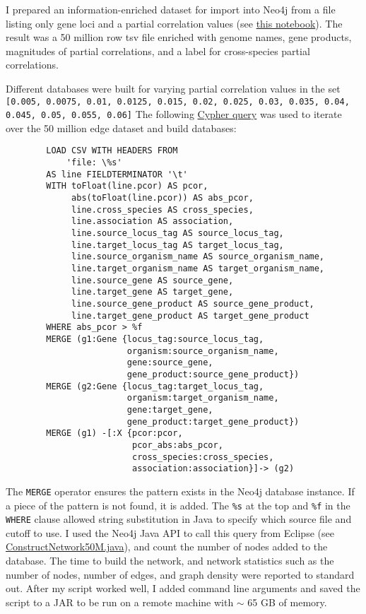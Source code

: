 \documentclass[12pt]{article}
\begin{document}
I prepared an information-enriched dataset for import into Neo4j from a file listing only gene loci and a partial correlation values (see \href{https://github.com/JanetMatsen/Neo4j_meta4/blob/master/jupyter/prepare_whole_network.ipynb}{this notebook}).  
The result was a 50 million row tsv file enriched with genome names, gene products, magnitudes of partial correlations, and a label for cross-species partial correlations.

Different databases were built for varying partial correlation values in the set \texttt{[0.005,  0.0075,  0.01,  0.0125,  0.015,  0.02,  0.025,  0.03,  0.035,  0.04,  0.045,  0.05,  0.055,  0.06]}
The following \href{https://github.com/JanetMatsen/Neo4j_meta4/blob/master/data_mining_Neo4j_v2_3_2/queries/load_network--specify_cutoff.txt}{Cypher query} was used to iterate over the 50 million edge dataset and build databases:

\begin{verbatim}
        LOAD CSV WITH HEADERS FROM
            'file: \%s'
        AS line FIELDTERMINATOR '\t'
        WITH toFloat(line.pcor) AS pcor,
             abs(toFloat(line.pcor)) AS abs_pcor,
             line.cross_species AS cross_species,
             line.association AS association,
             line.source_locus_tag AS source_locus_tag,
             line.target_locus_tag AS target_locus_tag,
             line.source_organism_name AS source_organism_name,
             line.target_organism_name AS target_organism_name,
             line.source_gene AS source_gene,
             line.target_gene AS target_gene,
             line.source_gene_product AS source_gene_product,
             line.target_gene_product AS target_gene_product
        WHERE abs_pcor > %f
        MERGE (g1:Gene {locus_tag:source_locus_tag,
                        organism:source_organism_name,
                        gene:source_gene,
                        gene_product:source_gene_product})
        MERGE (g2:Gene {locus_tag:target_locus_tag,
                        organism:target_organism_name,
                        gene:target_gene,
                        gene_product:target_gene_product})
        MERGE (g1) -[:X {pcor:pcor,
                         pcor_abs:abs_pcor,
                         cross_species:cross_species,
                         association:association}]-> (g2)
\end{verbatim}

The \texttt{MERGE} operator ensures the pattern exists in the Neo4j database instance.
If a piece of the pattern is not found, it is added. 
The \texttt{\%s} at the top and \texttt{\%f} in the \texttt{WHERE} clause allowed string substitution in Java to specify which source file and cutoff to use. 
I used the Neo4j Java API to call this query from Eclipse (see \href{https://github.com/JanetMatsen/Neo4j_meta4/blob/master/data_mining_Neo4j_v2_3_2/src/ConstructNetwork50M.java}{ConstructNetwork50M.java}), and count the number of nodes added to the database. 
The time to build the network, and network statistics such as the number of nodes, number of edges, and graph density were reported to standard out.
After my script worked well, I added command line arguments and saved the script to a JAR to be run on a remote machine with $\sim$ 65 GB of memory.
\end{document}

